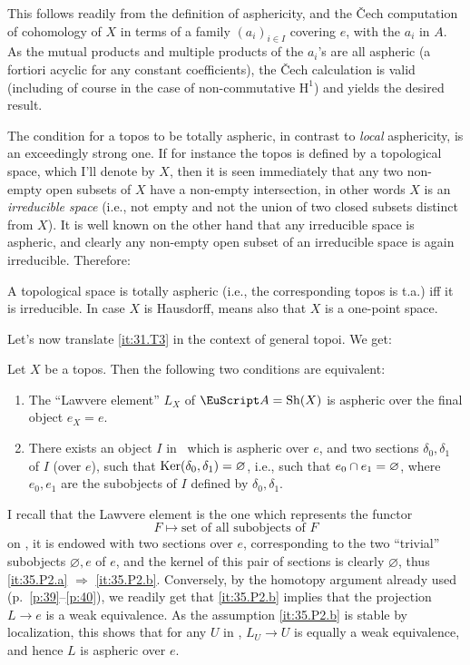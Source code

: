 This follows readily from the definition of asphericity, and the
\v{C}ech computation of cohomology of $X$ in terms of a family
$(a_i)_{i\in I}$ covering $e$, with the $a_i$ in $A$. As the mutual
products and multiple products of the $a_i$'s are all aspheric (a
fortiori acyclic for any constant coefficients), the \v Cech
calculation is valid (including of course in the case of
non-commutative $\mathrm H^1$) and yields the desired result.

The condition for a topos to be totally aspheric, in contrast to
\emph{local} asphericity, is an exceedingly strong one. If for
instance the topos is defined by a topological space, which I'll
denote by $X$, then it is seen immediately that any two non-empty open
subsets of $X$ have a non-empty intersection, in other words $X$ is an
\emph{irreducible space} (i.e., not empty and not the union of two
closed subsets distinct from $X$). It is well known on the other hand
that any irreducible space is aspheric, and clearly any non-empty open
subset of an irreducible space is again irreducible. Therefore:
\setcounter{corollarynum}{1}
\begin{corollarynum}\label{cor:35.1.2}
  A topological space is totally aspheric \textup{(}i.e., the
  corresponding topos is t.a.\textup{)} if{f} it is irreducible. In
  case $X$ is Hausdorff, means also that $X$ is a one-point space.
\end{corollarynum}

Let's now translate \ref{it:31.T3} in the context of general topoi. We
get:

\begin{propositionnum}\label{prop:35.2}
  Let $X$ be a topos. Then the following two conditions are
  equivalent:
  \begin{enumerate}[label=\alph*),font=\normalfont]
  \item\label{it:35.P2.a}
    The ``Lawvere element'' $L_X$ of $\scrA = \Sh(X)$ is aspheric
    over the final object $e_X=e$.
  \item\label{it:35.P2.b}
    There exists an object $I$ in \scrA\ which is aspheric over
    $e$, and two sections $\delta_0,\delta_1$ of $I$ \textup(over
    $e$\textup), such that $\operatorname{Ker}(\delta_0,\delta_1)=\varnothing$, i.e.,
    such that $e_0 \mathbin{\cap} e_1 = \varnothing$, where $e_0,e_1$ are the
    subobjects of $I$ defined by $\delta_0,\delta_1$.
  \end{enumerate}
\end{propositionnum}

I recall that the Lawvere element is the one which represents the
functor
\[ F \mapsto \text{set of all subobjects of $F$}\]
on \scrA, it is endowed with two sections over $e$, corresponding to
the two ``trivial'' subobjects $\varnothing, e$ of $e$, and the kernel
of this pair of sections is clearly $\varnothing$, thus \ref{it:35.P2.a}
$\Rightarrow$ \ref{it:35.P2.b}. Conversely, by the homotopy argument
already used (p.~\ref{p:39}--\ref{p:40}),
we readily get that \ref{it:35.P2.b}
implies that the projection $L\to e$ is a weak
equivalence. As the assumption \ref{it:35.P2.b} is stable by
localization, this shows that for any $U$ in \scrA, $L_U \to U$ is
equally a weak equivalence, and hence $L$ is aspheric over $e$.

